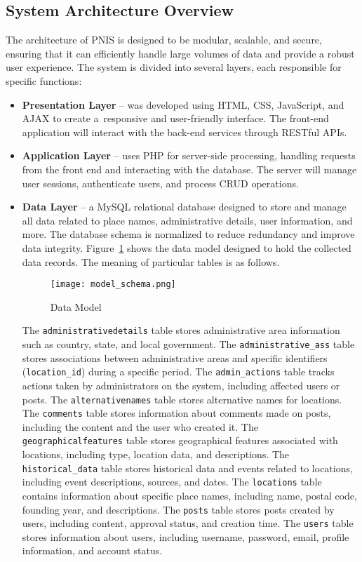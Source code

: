 \subsection{System Architecture Overview}
The architecture of PNIS is designed to be modular, scalable, and secure, ensuring that it can efficiently handle large volumes of data and provide a robust user experience. 
The system is divided into several layers, each responsible for specific functions:
\begin{itemize}
\item \textbf{Presentation Layer} -- was developed using HTML, CSS, JavaScript, and AJAX to create a~responsive and user-friendly interface. The front-end application will interact with the back-end services through RESTful APIs.
\item \textbf{Application Layer}  -- uses PHP for server-side processing, handling requests from the front end and interacting with the database. The server will manage user sessions, authenticate users, and process CRUD operations.
\item \textbf{Data Layer} -- a MySQL relational database designed to store and manage all data related to place names, administrative details, user information, and more. The database schema is normalized to reduce redundancy and improve data integrity. Figure~\ref{fig:dataModel} shows the data model designed to hold the collected data records. The meaning of particular tables is as follows.
\begin{figure}[htb]
    \centering
    \texttt{[image: model\_schema.png]}
    \caption{Data Model}
    \label{fig:dataModel}
\end{figure}
The \texttt{administrativedetails} table stores administrative area information such as country, state, and local government. The \texttt{administrative\_ass} table stores associations between administrative areas and specific identifiers (\texttt{location\_id}) during a specific period. The \texttt{admin\_actions} table tracks actions taken by administrators on the system, including affected users or posts. The \texttt{alternativenames} table stores alternative names for locations. The \texttt{comments} table stores information about comments made on posts, including the content and the user who created it. The \texttt{geographicalfeatures} table stores geographical features associated with locations, including type, location data, and descriptions. The \texttt{historical\_data} table stores historical data and events related to locations, including event descriptions, sources, and dates. The \texttt{locations} table contains information about specific place names, including name, postal code, founding year, and descriptions. The \texttt{posts} table stores posts created by users, including content, approval status, and creation time. The \texttt{users} table stores information about users, including username, password, email, profile information, and account status.

\end{itemize}
